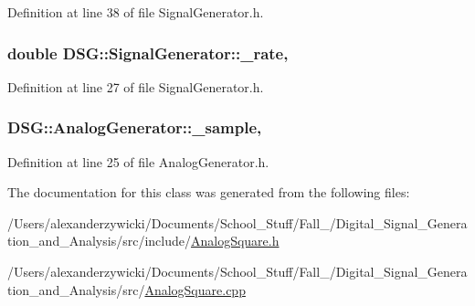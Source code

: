 Definition at line 38 of file Signal\+Generator.\+h.

\hypertarget{classDSG_1_1SignalGenerator_aa10f6c85d9adee901139ea7fb346f39d}{
\subsubsection[{\+\_\+rate}]{\setlength{\rightskip}{0pt plus 5cm}double D\+S\+G\+::\+Signal\+Generator\+::\+\_\+rate\hspace{0.3cm}{\ttfamily [protected]}, {\ttfamily [inherited]}}}\label{classDSG_1_1SignalGenerator_aa10f6c85d9adee901139ea7fb346f39d}


Definition at line 27 of file Signal\+Generator.\+h.

\hypertarget{classDSG_1_1AnalogGenerator_ac88ad591cac37f636c2f7b460480bef9}{
\subsubsection[{\+\_\+sample}]{ D\+S\+G\+::\+Analog\+Generator\+::\+\_\+sample\hspace{0.3cm}{\ttfamily [protected]}, {\ttfamily [inherited]}}}\label{classDSG_1_1AnalogGenerator_ac88ad591cac37f636c2f7b460480bef9}


Definition at line 25 of file Analog\+Generator.\+h.



The documentation for this class was generated from the following files\+:\begin{DoxyCompactItemize}
\item 
/\+Users/alexanderzywicki/\+Documents/\+School\+\_\+\+Stuff/\+Fall\+\_/\+Digital\+\_\+\+Signal\+\_\+\+Generation\+\_\+and\+\_\+\+Analysis/src/include/\hyperlink{AnalogSquare_8h}{Analog\+Square.\+h}\item 
/\+Users/alexanderzywicki/\+Documents/\+School\+\_\+\+Stuff/\+Fall\+\_/\+Digital\+\_\+\+Signal\+\_\+\+Generation\+\_\+and\+\_\+\+Analysis/src/\hyperlink{AnalogSquare_8cpp}{Analog\+Square.\+cpp}\end{DoxyCompactItemize}
